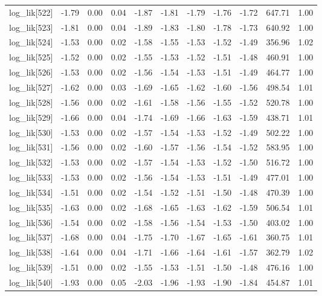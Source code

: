 \begin{table}[ht]
\begin{tabular}{rrrrrrrrrrr}
  log\_lik[522] & -1.79 & 0.00 & 0.04 & -1.87 & -1.81 & -1.79 & -1.76 & -1.72 & 647.71 & 1.00 \\ 
  log\_lik[523] & -1.81 & 0.00 & 0.04 & -1.89 & -1.83 & -1.80 & -1.78 & -1.73 & 640.92 & 1.00 \\ 
  log\_lik[524] & -1.53 & 0.00 & 0.02 & -1.58 & -1.55 & -1.53 & -1.52 & -1.49 & 356.96 & 1.02 \\ 
  log\_lik[525] & -1.52 & 0.00 & 0.02 & -1.55 & -1.53 & -1.52 & -1.51 & -1.48 & 460.91 & 1.00 \\ 
  log\_lik[526] & -1.53 & 0.00 & 0.02 & -1.56 & -1.54 & -1.53 & -1.51 & -1.49 & 464.77 & 1.00 \\ 
  log\_lik[527] & -1.62 & 0.00 & 0.03 & -1.69 & -1.65 & -1.62 & -1.60 & -1.56 & 498.54 & 1.01 \\ 
  log\_lik[528] & -1.56 & 0.00 & 0.02 & -1.61 & -1.58 & -1.56 & -1.55 & -1.52 & 520.78 & 1.00 \\ 
  log\_lik[529] & -1.66 & 0.00 & 0.04 & -1.74 & -1.69 & -1.66 & -1.63 & -1.59 & 438.71 & 1.01 \\ 
  log\_lik[530] & -1.53 & 0.00 & 0.02 & -1.57 & -1.54 & -1.53 & -1.52 & -1.49 & 502.22 & 1.00 \\ 
  log\_lik[531] & -1.56 & 0.00 & 0.02 & -1.60 & -1.57 & -1.56 & -1.54 & -1.52 & 583.95 & 1.00 \\ 
  log\_lik[532] & -1.53 & 0.00 & 0.02 & -1.57 & -1.54 & -1.53 & -1.52 & -1.50 & 516.72 & 1.00 \\ 
  log\_lik[533] & -1.53 & 0.00 & 0.02 & -1.56 & -1.54 & -1.53 & -1.51 & -1.49 & 477.01 & 1.00 \\ 
  log\_lik[534] & -1.51 & 0.00 & 0.02 & -1.54 & -1.52 & -1.51 & -1.50 & -1.48 & 470.39 & 1.00 \\ 
  log\_lik[535] & -1.63 & 0.00 & 0.02 & -1.68 & -1.65 & -1.63 & -1.62 & -1.59 & 506.54 & 1.01 \\ 
  log\_lik[536] & -1.54 & 0.00 & 0.02 & -1.58 & -1.56 & -1.54 & -1.53 & -1.50 & 403.02 & 1.00 \\ 
  log\_lik[537] & -1.68 & 0.00 & 0.04 & -1.75 & -1.70 & -1.67 & -1.65 & -1.61 & 360.75 & 1.01 \\ 
  log\_lik[538] & -1.64 & 0.00 & 0.04 & -1.71 & -1.66 & -1.64 & -1.61 & -1.57 & 362.79 & 1.02 \\ 
  log\_lik[539] & -1.51 & 0.00 & 0.02 & -1.55 & -1.53 & -1.51 & -1.50 & -1.48 & 476.16 & 1.00 \\ 
  log\_lik[540] & -1.93 & 0.00 & 0.05 & -2.03 & -1.96 & -1.93 & -1.90 & -1.84 & 454.87 & 1.01 \\ 

\end{tabular}
\end{table}
